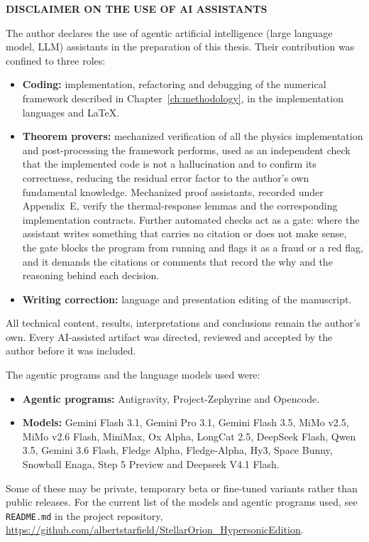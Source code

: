 \clearpage
{}
{}
\begin{center}
\textbf{\large  DISCLAIMER ON THE USE OF AI ASSISTANTS}\\[0.5cm]
\end{center}

\noindent The author declares the use of agentic artificial intelligence (large language model, LLM) assistants in the preparation of this thesis. Their contribution was confined to three roles:

\begin{itemize}
    \item \textbf{Coding:} implementation, refactoring and debugging of the numerical framework described in Chapter~\ref{ch:methodology}, in the implementation languages and \LaTeX.
    \item \textbf{Theorem provers:} mechanized verification of all the physics implementation and post-processing the framework performs, used as an independent check that the implemented code is not a hallucination and to confirm its correctness, reducing the residual error factor to the author's own fundamental knowledge. Mechanized proof assistants, recorded under Appendix~E, verify the thermal-response lemmas and the corresponding implementation contracts. Further automated checks act as a gate: where the assistant writes something that carries no citation or does not make sense, the gate blocks the program from running and flags it as a fraud or a red flag, and it demands the citations or comments that record the why and the reasoning behind each decision.
    \item \textbf{Writing correction:} language and presentation editing of the manuscript.
\end{itemize}

\noindent All technical content, results, interpretations and conclusions remain the author's own. Every AI-assisted artifact was directed, reviewed and accepted by the author before it was included.

\medskip
\noindent The agentic programs and the language models used were:
\begin{itemize}
    \item \textbf{Agentic programs:} Antigravity, Project-Zephyrine and Opencode.
    \item \textbf{Models:} Gemini Flash 3.1, Gemini Pro 3.1, Gemini Flash 3.5, MiMo v2.5, MiMo v2.6 Flash, MiniMax, Ox Alpha, LongCat 2.5, DeepSeek Flash, Qwen 3.5, Gemini 3.6 Flash, Fledge Alpha, Fledge-Alpha, Hy3, Space Bunny, Snowball Enaga, Step 5 Preview and Deepseek V4.1 Flash.
\end{itemize}

\noindent Some of these may be private, temporary beta or fine-tuned variants rather than public releases. For the current list of the models and agentic programs used, see \texttt{README.md} in the project repository, \url{https://github.com/albertstarfield/StellarOrion_HypersonicEdition}.
